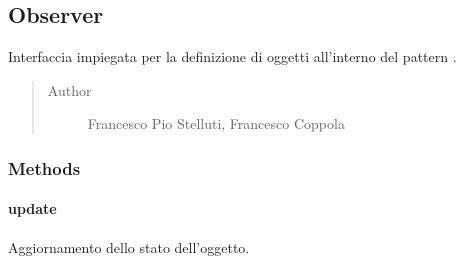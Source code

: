 \documentclass[letterpaper,10pt,italian,openany,oneside]{sphinxmanual}
\begin{document}
\begin{fulllineitems}
\label{\detokenize{test/it/unicam/cs/pa/mastermind/gamecore/Observable:it.unicam.cs.pa.mastermind.gamecore.Observable.setupObservers()}}
\end{fulllineitems}



\subsection{Observer}
\label{\detokenize{test/it/unicam/cs/pa/mastermind/gamecore/Observer:observer}}\label{\detokenize{test/it/unicam/cs/pa/mastermind/gamecore/Observer::doc}}

\begin{fulllineitems}
\label{\detokenize{test/it/unicam/cs/pa/mastermind/gamecore/Observer:it.unicam.cs.pa.mastermind.gamecore.Observer}}
Interfaccia impiegata per la definizione di oggetti  all’interno del pattern .
\begin{quote}\begin{description}
\item[{Author}] \leavevmode
Francesco Pio Stelluti, Francesco Coppola

\end{description}\end{quote}

\end{fulllineitems}



\subsubsection{Methods}
\label{\detokenize{test/it/unicam/cs/pa/mastermind/gamecore/Observer:methods}}

\paragraph{update}
\label{\detokenize{test/it/unicam/cs/pa/mastermind/gamecore/Observer:update}}

\begin{fulllineitems}
\label{\detokenize{test/it/unicam/cs/pa/mastermind/gamecore/Observer:it.unicam.cs.pa.mastermind.gamecore.Observer.update(Observable)}}
Aggiornamento dello stato dell’oggetto.

\end{fulllineitems}
\end{document}
